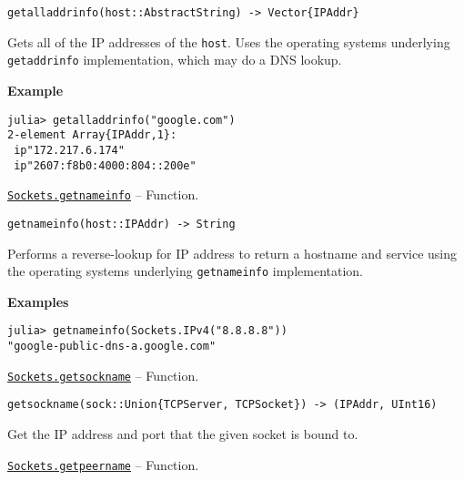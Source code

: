 \begin{adjustwidth}{2em}{0pt}


\begin{verbatim}
getalladdrinfo(host::AbstractString) -> Vector{IPAddr}
\end{verbatim}

Gets all of the IP addresses of the \texttt{host}. Uses the operating system{\textquotesingle}s underlying \texttt{getaddrinfo} implementation, which may do a DNS lookup.

\textbf{Example}


\begin{verbatim}
julia> getalladdrinfo("google.com")
2-element Array{IPAddr,1}:
 ip"172.217.6.174"
 ip"2607:f8b0:4000:804::200e"
\end{verbatim}



\end{adjustwidth}
\hypertarget{8933801763213702510}{} 
\hyperlink{8933801763213702510}{\texttt{Sockets.getnameinfo}}  -- {Function.}

\begin{adjustwidth}{2em}{0pt}


\begin{verbatim}
getnameinfo(host::IPAddr) -> String
\end{verbatim}

Performs a reverse-lookup for IP address to return a hostname and service using the operating system{\textquotesingle}s underlying \texttt{getnameinfo} implementation.

\textbf{Examples}


\begin{verbatim}
julia> getnameinfo(Sockets.IPv4("8.8.8.8"))
"google-public-dns-a.google.com"
\end{verbatim}



\end{adjustwidth}
\hypertarget{16393779334284193287}{} 
\hyperlink{16393779334284193287}{\texttt{Sockets.getsockname}}  -- {Function.}

\begin{adjustwidth}{2em}{0pt}


\begin{verbatim}
getsockname(sock::Union{TCPServer, TCPSocket}) -> (IPAddr, UInt16)
\end{verbatim}

Get the IP address and port that the given socket is bound to.



\end{adjustwidth}
\hypertarget{3342627656847235889}{} 
\hyperlink{3342627656847235889}{\texttt{Sockets.getpeername}}  -- {Function.}

